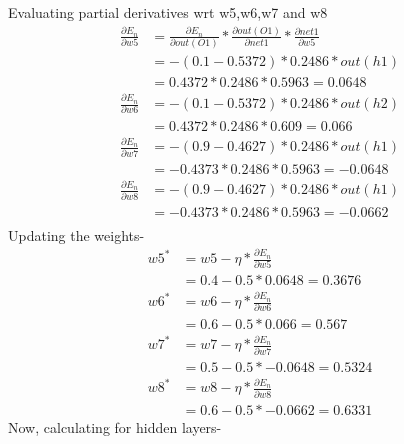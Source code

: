 \documentclass[12pt]{article}
\begin{document}
Evaluating partial derivatives wrt w5,w6,w7 and w8
\begin{align*}
    \frac{\partial E_n}{\partial w5}
    &=\frac{\partial E_n}{\partial out(O1)}*\frac{\partial out(O1)}{\partial net1} * \frac{\partial net1}{\partial w5}\\
    &=-(0.1-0.5372)*0.2486*out(h1)\\
    &=0.4372*0.2486*0.5963=0.0648\\
    \frac{\partial E_n}{\partial w6}
    &=-(0.1-0.5372)*0.2486*out(h2)\\
    &=0.4372*0.2486*0.609=0.066\\
    \frac{\partial E_n}{\partial w7}
    &=-(0.9-0.4627)*0.2486*out(h1)\\
    &=-0.4373*0.2486*0.5963=-0.0648\\
    \frac{\partial E_n}{\partial w8}
    &=-(0.9-0.4627)*0.2486*out(h1)\\
    &=-0.4373*0.2486*0.5963=-0.0662\\
\end{align*}
Updating the weights-
\begin{align*}
    w5^{*}
    &=w5-\eta * \frac{\partial E_n}{\partial w5}\\
    &=0.4-0.5*0.0648=0.3676\\
    w6^{*}
    &=w6-\eta * \frac{\partial E_n}{\partial w6}\\
    &=0.6-0.5*0.066=0.567\\
    w7^{*}
    &=w7-\eta * \frac{\partial E_n}{\partial w7}\\
    &=0.5-0.5*-0.0648=0.5324\\
    w8^{*}
    &=w8-\eta * \frac{\partial E_n}{\partial w8}\\
    &=0.6-0.5*-0.0662=0.6331
\end{align*}
Now, calculating for hidden layers-\\
\end{document}
